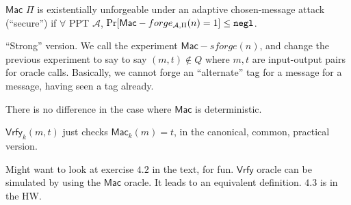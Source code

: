 \documentclass[12pt]{article}
\newcommand{\AAA}{\mathcal{A}}
\newcommand{\Mac}{\mathsf{Mac}}
\newcommand{\Vrfy}{\mathsf{Vrfy}}
\newcommand{\negl}{\tt negl}
\begin{document}
$\Mac$ $\Pi$ is existentially unforgeable under an adaptive chosen-message attack (``secure'') if $\forall$ PPT $\AAA$, $\Pr[\Mac-forge_{\AAA,\Pi}(n)=1]\leq\negl$.

``Strong'' version. We call the experiment $\Mac-sforge(n)$, and change the previous experiment to say to say $(m,t)\not\in Q$ where $m,t$ are input-output pairs for oracle calls. Basically, we cannot forge an ``alternate'' tag for a message for a message, having seen a tag already.

There is no difference in the case where $\Mac$ is deterministic.

$\Vrfy_k(m,t)$ just checks $\Mac_k(m)=t$, in the canonical, common, practical version.

Might want to look at exercise $4.2$ in the text, for fun. $\Vrfy$ oracle can be simulated by using the $\Mac$ oracle. It leads to an equivalent definition. $4.3$ is in the HW.
\end{document}
